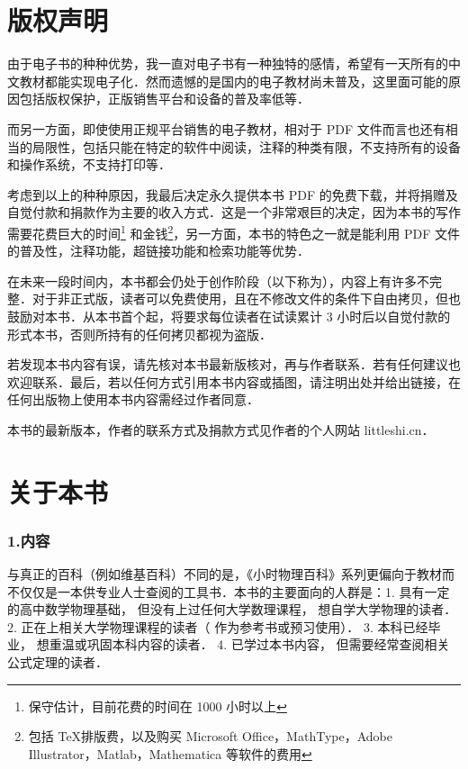 
\chapter*{版权声明}
由于电子书的种种优势，我一直对电子书有一种独特的感情，希望有一天所有的中文教材都能实现电子化．然而遗憾的是国内的电子教材尚未普及，这里面可能的原因包括版权保护，正版销售平台和设备的普及率低等．

而另一方面，即使使用正规平台销售的电子教材，相对于 PDF 文件而言也还有相当的局限性，包括只能在特定的软件中阅读，注释的种类有限，不支持所有的设备和操作系统，不支持打印等． 

考虑到以上的种种原因，我最后决定永久提供本书 PDF 的免费下载，并将捐赠及自觉付款和捐款作为主要的收入方式．这是一个非常艰巨的决定，因为本书的写作需要花费巨大的时间\footnote{保守估计，目前花费的时间在 1000 小时以上} 和金钱\footnote{包括 \TeX 排版费，以及购买 Microsoft Office，MathType，Adobe Illustrator，Matlab，Mathematica 等软件的费用}，另一方面，本书的特色之一就是能利用 PDF 文件的普及性，注释功能，超链接功能和检索功能等优势．

在未来一段时间内，本书都会仍处于创作阶段（以下称为），内容上有许多不完整．对于非正式版，读者可以免费使用，且在不修改文件的条件下自由拷贝，但也鼓励对本书．从本书首个起，将要求每位读者在试读累计 3 小时后以自觉付款的形式本书，否则所持有的任何拷贝都视为盗版．

若发现本书内容有误，请先核对本书最新版核对，再与作者联系．若有任何建议也欢迎联系．最后，若以任何方式引用本书内容或插图，请注明出处并给出链接，在任何出版物上使用本书内容需经过作者同意．

本书的最新版本，作者的联系方式及捐款方式见作者的个人网站 littleshi.cn．


\chapter*{关于本书}

\subsection{1.内容}

与真正的百科（例如维基百科）不同的是，《小时物理百科》系列更偏向于教材而不仅仅是一本供专业人士查阅的工具书．本书的主要面向的人群是：1. 具有一定的高中数学物理基础， 但没有上过任何大学数理课程， 想自学大学物理的读者． 2. 正在上相关大学物理课程的读者（ 作为参考书或预习使用）． 3. 本科已经毕业， 想重温或巩固本科内容的读者． 4. 已学过本书内容， 但需要经常查阅相关公式定理的读者．

